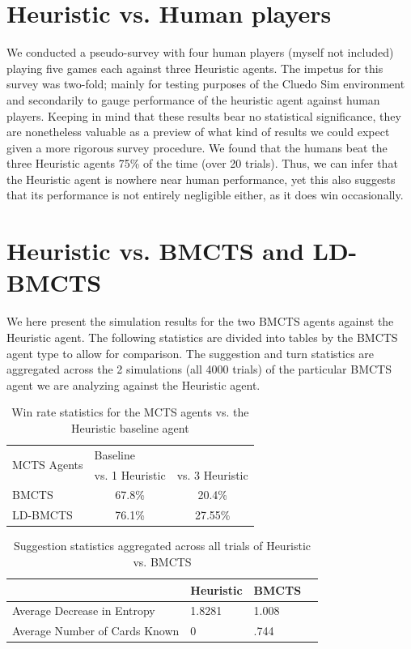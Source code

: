 \documentclass[msc, ai, logo, twoside, notimes, parskip, leftchapter, normalheadings]{infthesis}
\begin{document}
\section{Heuristic vs. Human players}
We conducted a pseudo-survey with four human players (myself not included) playing five games each against three Heuristic agents. The impetus for this survey was two-fold; mainly for testing purposes of the Cluedo Sim environment and secondarily to gauge performance of the heuristic agent against human players. Keeping in mind that these results bear no statistical significance, they are nonetheless valuable as a preview of what kind of results we could expect given a more rigorous survey procedure. We found that the humans beat the three Heuristic agents 75\% of the time (over 20 trials). Thus, we can infer that the Heuristic agent is nowhere near human performance, yet this also suggests that its performance is not entirely negligible either, as it does win occasionally.

\section{Heuristic vs. BMCTS and LD-BMCTS}
We here present the simulation results for the two BMCTS agents against the Heuristic agent. The following statistics are divided into tables by the BMCTS agent type to allow for comparison. The suggestion and turn statistics are aggregated across the 2 simulations (all 4000 trials) of the particular BMCTS agent we are analyzing against the Heuristic agent. 

\begin{table}[H]
\centering
\caption{Win rate statistics for the MCTS agents vs. the Heuristic baseline agent}
\begin{tabular}{l|llll}
\multirow{2}{*}{MCTS Agents} & \multicolumn{4}{l}{Baseline} \\ \cline{2-5} 
& \multicolumn{2}{l|}{vs. 1 Heuristic} & \multicolumn{2}{l}{vs. 3 Heuristic} \\ \hline \hline
BMCTS & \multicolumn{2}{c}{67.8\%} & \multicolumn{2}{c}{20.4\%} \\
LD-BMCTS & \multicolumn{2}{c}{76.1\%} & \multicolumn{2}{c}{27.55\%} 
\end{tabular}
\end{table}

\begin{table}[H]
\centering
\caption{Suggestion statistics aggregated across all trials of Heuristic vs. BMCTS}
\begin{tabular}{l|lll}
& \multicolumn{1}{l|}{Heuristic} & \multicolumn{1}{l|}{BMCTS}\\ \hline \hline
Average Decrease in Entropy & 1.8281 & 1.008 \\
Average Number of Cards Known & 0\footnotemark & .744 \\
\end{tabular}
\end{table}
\end{document}
